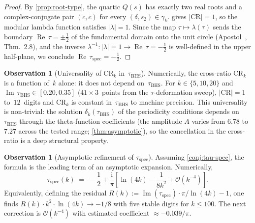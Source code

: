\documentclass[11pt,a4paper]{article}
\theoremstyle{plain}
\theoremstyle{definition}
\newtheorem{observation}[theorem]{Observation}
\theoremstyle{remark}
\DeclareMathOperator{\Real}{Re}
\DeclareMathOperator{\Imag}{Im}
\newcommand{\ii}{\mathrm{i}}
\newcommand{\abs}[1]{\lvert #1 \rvert}
\newcommand{\Oo}{\mathcal{O}}
\begin{document}
\begin{proof}
By \cref{prop:root-type}, the quartic $Q(s)$ has exactly two real
roots and a complex-conjugate pair $(c,\bar c)$ for every
$(\delta,s_2) \in \gamma_k$.   gives
$\lvert\mathrm{CR}\rvert = 1$, so the modular lambda function
satisfies $\lvert\lambda\rvert = 1$.  Since the map
$\tau \mapsto \lambda(\tau)$ sends the boundary
$\Real\,\tau = \pm\tfrac12$ of the fundamental domain onto the
unit circle (Apostol~\cite{Apo90}, Thm.~2.8), and the
inverse $\lambda^{-1}\colon \abs{\lambda}=1 \to
\Real\,\tau = -\tfrac12$ is well-defined in the upper
half-plane, we conclude
$\Real\,\tau_{\mathrm{spec}} = -\tfrac12$.
\end{proof}

\begin{observation}[Universality of $\mathrm{CR}_k$ in~$\tau_{\mathrm{BHS}}$]
\label{obs:CR-universal}
Numerically, the cross-ratio $\mathrm{CR}_k$ is a
function of~$k$ alone: it does not depend on~$\tau_{\mathrm{BHS}}$.
For $k \in \{5, 10, 20\}$ and
$\Imag\,\tau_{\mathrm{BHS}} \in [0.20, 0.35]$
($41 \times 3$~points from the $\tau$-deformation sweep),
$\lvert\mathrm{CR}\rvert = 1$ to~$12$~digits and 
$\mathrm{CR}_k$ is constant in~$\tau_{\mathrm{BHS}}$
to machine precision.
This universality is non-trivial: the solution
$\delta_k(\tau_{\mathrm{BHS}})$ of the periodicity conditions
depends on~$\tau_{\mathrm{BHS}}$ through the theta-function
coefficients (the amplitude $A$ varies from $6.78$ to $7.27$
across the tested range; \cref{thm:asymptotic}), so the
cancellation in the cross-ratio is a deep structural property.
\end{observation}

\begin{observation}[Asymptotic refinement of $\tau_{\mathrm{spec}}$]
\label{cor:tau-refined}
Assuming \cref{conj:tau-spec}, the formula is the leading term of an
asymptotic expansion.  Numerically,
\begin{equation}\label{eq:tau-refined}
  \tau_{\mathrm{spec}}(k)
  \;=\; -\frac{1}{2}
  + \frac{\ii}{\pi}\!\left[
    \ln(4k) - \frac{1}{8k^2} + \Oo(k^{-4})
  \right].
\end{equation}
Equivalently, defining the residual
$R(k) := \Imag(\tau_{\mathrm{spec}})\cdot\pi/\ln(4k) - 1$,
one finds $R(k)\cdot k^2 \cdot \ln(4k) \to -1/8$
with five stable digits for $k \le 100$.
The next correction is $\Oo(k^{-4})$ with estimated
coefficient $\approx -0.039/\pi$.
\end{observation}
\end{document}
